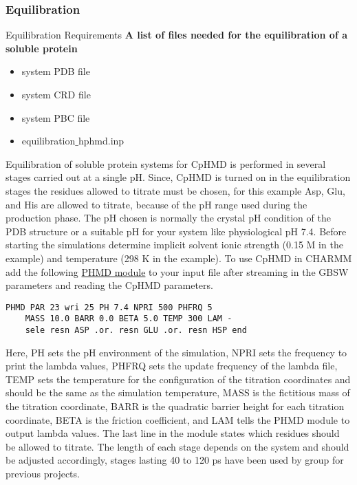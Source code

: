 \documentclass[9pt,tutorial]{livecoms}
\begin{document}
\subsubsection{Equilibration}

\begin{checklist}{Equilibration Requirements}
\textbf{A list of files needed for the equilibration of a soluble protein}
\begin{itemize}
\item system PDB file 
\item system CRD file 
\item system PBC file
\item equilibration$\_$hphmd.inp
\end{itemize}
\end{checklist}

Equilibration of soluble protein systems for CpHMD is performed in several stages carried out at a single pH.
Since, CpHMD is turned on in the equilibration stages the residues allowed to titrate must be chosen, for this example Asp, Glu, and His are allowed to titrate, because of the pH range used during the production phase.
The pH chosen is normally the crystal pH condition of the PDB structure or a suitable pH for your system like physiological pH 7.4.
Before starting the simulations determine implicit solvent ionic strength (0.15 M in the example) and temperature (298 K in the example).
To use CpHMD in CHARMM add the following \href{https://hpc.nih.gov/apps/charmm/c42b2html/phmd.html}{PHMD module} to your input file after streaming in the GBSW parameters and reading the CpHMD parameters. 
%
\begin{lstlisting}
PHMD PAR 23 wri 25 PH 7.4 NPRI 500 PHFRQ 5 
    MASS 10.0 BARR 0.0 BETA 5.0 TEMP 300 LAM -
    sele resn ASP .or. resn GLU .or. resn HSP end
\end{lstlisting}
%
Here, PH sets the pH environment of the simulation, NPRI sets the frequency to print the lambda values, PHFRQ sets the update frequency of the lambda file, TEMP sets the temperature for the configuration of the titration coordinates and should be the same as the simulation temperature, MASS is the fictitious mass of the titration coordinate, BARR is the quadratic barrier height for each titration coordinate, BETA is the friction coefficient, and LAM tells the PHMD module to output lambda values.
The last line in the module states which residues should be allowed to titrate. 
The length of each stage depends on the system and should be adjusted accordingly, stages lasting 40 to 120 ps have been used by group for previous projects.
\end{document}
